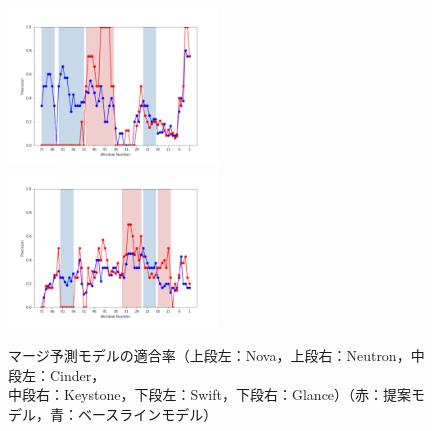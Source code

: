 \documentclass[11pt]{jreport}
\begin{document}
\begin{figure}[H]
\begin{minipage}{\textwidth}
\begin{center}
    \includegraphics[width=0.495\textwidth]{Uenaka_fig/RQ2_result/Swift_merge_Precision.pdf}
    \includegraphics[width=0.495\textwidth]{Uenaka_fig/RQ2_result/Glance_merge_Precision.pdf}
    \caption{マージ予測モデルの適合率（上段左：Nova，上段右：Neutron，中段左：Cinder，\\ 中段右：Keystone，下段左：Swift，下段右：Glance）（赤：提案モデル，青：ベースラインモデル）}
    \label{fig:merge_p}
\end{center}
\vspace{0.08\textheight}
\end{minipage}
\end{figure}
\end{document}
